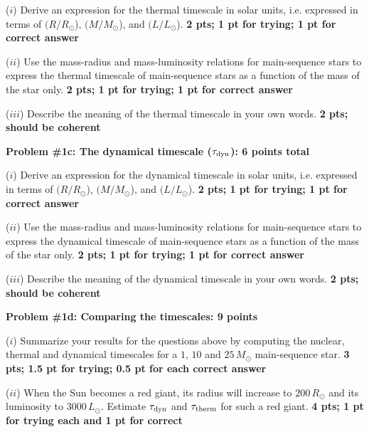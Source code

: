 \documentclass[11pt, a4paper]{article}
\begin{document}
 \vspace{4pt}
 \noindent ($i$) Derive an expression for the thermal timescale in solar units,
 i.e. expressed in terms of $(R/R_{\odot}$), $(M/M_{\odot}$), and
 $(L/L_{\odot}$). \textbf{2 pts; 1 pt for trying; 1 pt for correct answer}

 \vspace{8pt}
 \noindent ($ii$) Use the mass-radius and mass-luminosity relations for
 main-sequence stars to express the thermal timescale of main-sequence stars as
 a function of the mass of the star only. \textbf{2 pts; 1 pt for trying; 1 pt
 for correct answer}

 \vspace{8pt}
 \noindent ($iii$) Describe the meaning of the thermal timescale in your own
 words. \textbf{2 pts; should be coherent}

 \vspace{10pt}
 \noindent \textbf{Problem \#1c: The dynamical timescale ($\tau_{\rm{dyn}}$): 6
 points total}

 \vspace{4pt}
 \noindent ($i$) Derive an expression for the dynamical timescale in solar
 units, i.e. expressed in terms of $(R/R_{\odot}$), $(M/M_{\odot}$), and
 $(L/L_{\odot}$). \textbf{2 pts; 1 pt for trying; 1 pt for correct answer}

 \vspace{8pt}
 \noindent ($ii$) Use the mass-radius and mass-luminosity relations for
 main-sequence stars to express the dynamical timescale of main-sequence stars
 as a function of the mass of the star only. \textbf{2 pts; 1 pt for trying; 1
 pt for correct answer}

 \vspace{4pt}
 \noindent ($iii$) Describe the meaning of the dynamical timescale in your own
 words. \textbf{2 pts; should be coherent}


 \vspace{10pt}
 \noindent \textbf{Problem \#1d: Comparing the timescales: 9 points}

 \vspace{4pt}
 \noindent ($i$) Summarize your results for the questions above by computing the
 nuclear, thermal and dynamical timescales for a $1$, $10$ and $25\,M_{\odot}$
 main-sequence star. \textbf{3 pts; 1.5 pt for trying; 0.5 pt for each correct
 answer}

 \vspace{4pt}
 \noindent ($ii$) When the Sun becomes a red giant, its radius will increase to
 $200\,R_{\odot}$ and its luminosity to $3000\,L_{\odot}$. Estimate
 $\tau_{\rm{dyn}}$ and $\tau_{\rm{therm}}$ for such a red giant. \textbf{4 pts;
 1 pt for trying each and 1 pt for correct}
\end{document}
